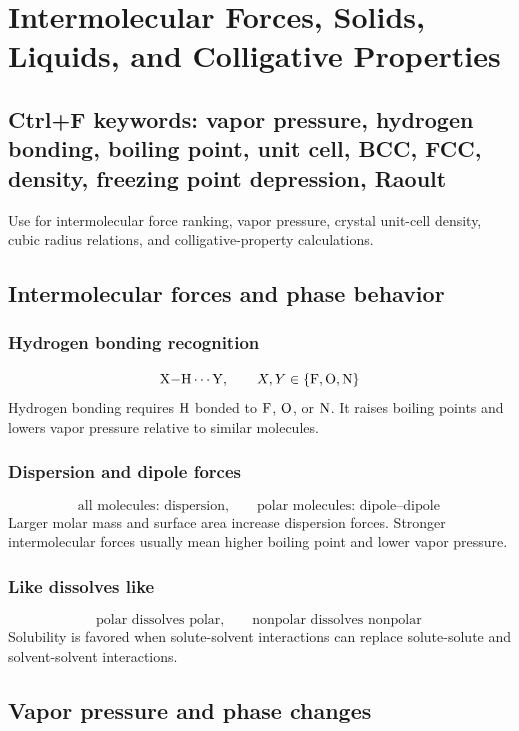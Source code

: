 \section{Intermolecular Forces, Solids, Liquids, and Colligative Properties}

\subsection{Ctrl+F keywords: vapor pressure, hydrogen bonding, boiling point, unit cell, BCC, FCC, density, freezing point depression, Raoult}
Use for intermolecular force ranking, vapor pressure, crystal unit-cell density, cubic radius relations, and colligative-property calculations.

\subsection{Intermolecular forces and phase behavior}

\subsubsection{Hydrogen bonding recognition}
\[
\mathrm{X{-}H\cdots Y}, \qquad X,Y\in\{\ce{F},\ce{O},\ce{N}\}
\]
Hydrogen bonding requires \(\ce{H}\) bonded to \(\ce{F}\), \(\ce{O}\), or \(\ce{N}\). It raises boiling points and lowers vapor pressure relative to similar molecules.

\subsubsection{Dispersion and dipole forces}
\[
\text{all molecules: dispersion}, \qquad \text{polar molecules: dipole--dipole}
\]
Larger molar mass and surface area increase dispersion forces. Stronger intermolecular forces usually mean higher boiling point and lower vapor pressure.

\subsubsection{Like dissolves like}
\[
\text{polar dissolves polar}, \qquad \text{nonpolar dissolves nonpolar}
\]
Solubility is favored when solute-solvent interactions can replace solute-solute and solvent-solvent interactions.

\subsection{Vapor pressure and phase changes}


